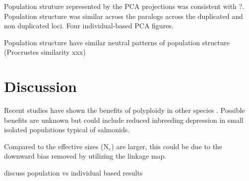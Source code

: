 \documentclass[12pt, one column]{article}
\begin{document}
Population struture represented by the PCA projections was consistent with \citet{Small2014}?.  Population structure was similar across the paralogs across the duplicated and non duplicated loci. Four individual-based PCA figures. 


Population structure  have similar neutral patterns of population structure (Procrustes similarity xxx)



\section*{Discussion}

Recent studies have shown the benefits of polyploidy in other species \citep{Selmecki2015}.  Possible benefits are unknown but could include reduced inbreeding depression in small isolated populations typical of salmonids.

Compared to \citet{Small2014} the effective sizes (N$_{e}$) are larger, this could be due to the downward bias removed by utilizing the linkage map.

discuss population vs individual based results

\pagebreak
\end{document}
